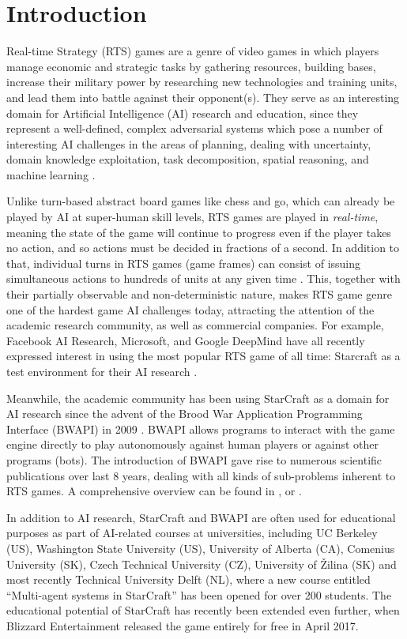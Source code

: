 \section{Introduction}\label{secIntro}

Real-time Strategy (RTS) games are a genre of video games in which players manage economic and strategic tasks by gathering resources, building bases, increase their military power by researching new technologies and training units, and lead them into battle against their opponent(s). They serve as an interesting domain for Artificial Intelligence (AI) research and education, since they represent a well-defined, complex adversarial systems \cite{Buro2004} which pose a number of interesting AI challenges in the areas of planning, dealing with uncertainty, domain knowledge exploitation, task decomposition, spatial reasoning, and machine learning \cite{Survey2013}.

Unlike turn-based abstract board games like chess and go, which can already be played by AI at super-human skill levels, RTS games are played in \textit{real-time}, meaning the state of the game will continue to progress even if the player takes no action, and so actions must be decided in fractions of a second. In addition to that, individual turns in RTS games (game frames) can consist of issuing simultaneous actions to hundreds of units at any given time \cite{buro2012real}. This, together with their partially observable and non-deterministic nature, makes RTS game genre one of the hardest game AI challenges today, attracting the attention of the academic research community, as well as commercial companies. For example, Facebook AI Research, Microsoft, and Google DeepMind have all recently expressed interest in using the most popular RTS game of all time: Starcraft as a test environment for their AI research \cite{gibney2016google}. 

Meanwhile, the academic community has been using StarCraft as a domain for AI research since the advent of the Brood War Application Programming Interface (BWAPI) in 2009 \cite{heinermann2013bwapi}. BWAPI allows programs to interact with the game engine directly to play autonomously against human players or against other programs (bots). The introduction of BWAPI gave rise to numerous scientific publications over last 8 years, dealing with all kinds of sub-problems inherent to RTS games. A comprehensive overview can be found in \cite{churchill2016starcraft}, \cite{ontanon2015rts} or \cite{Survey2013}.

In addition to AI research, StarCraft and BWAPI are often used for educational purposes as part of AI-related  courses at universities, including UC Berkeley (US), Washington State University (US), University of Alberta (CA), Comenius University (SK), Czech Technical University (CZ), University of \v{Z}ilina (SK) and most recently Technical University Delft (NL), where a new course entitled ``Multi-agent systems in StarCraft'' has been opened for over 200 students. The educational potential of StarCraft has recently been extended even further, when Blizzard Entertainment released the game entirely for free in April 2017.

